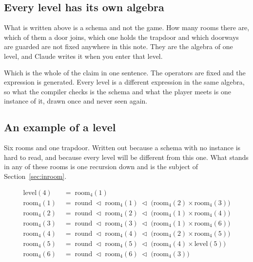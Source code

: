 \documentclass[11pt,a4paper]{article}
\begin{document}
\subsection{Every level has its own algebra}

What is written above is a schema and not the game. How many rooms there are, which of them a door
joins, which one holds the trapdoor and which doorways are guarded are not fixed anywhere in this
note. They are the algebra of one level, and Claude writes it when you enter that level.

\begin{sectionbox}
Which is the whole of the claim in one sentence. The operators are fixed and the expression is
generated. Every level is a different expression in the same algebra, so what the compiler checks
is the schema and what the player meets is one instance of it, drawn once and never seen again.
\end{sectionbox}

\subsection{An example of a level}
\label{sec:example}

Six rooms and one trapdoor. Written out because a schema with no instance is hard to read, and
because every level will be different from this one. What stands in any of these rooms is one
recursion down and is the subject of Section~\ref{sec:inroom}.

\begin{center}
\begin{tcolorbox}[plainbg, colback=pale, width=0.9\textwidth]
\begin{align*}
\text{level}(4)  \;&=\; \text{room}_4(1) \\
\text{room}_4(1) \;&=\; \text{round} \;\lhd\; \text{room}_4(1) \;\lhd\;
   \bigl( \text{room}_4(2) \times \text{room}_4(3) \bigr) \\
\text{room}_4(2) \;&=\; \text{round} \;\lhd\; \text{room}_4(2) \;\lhd\;
   \bigl( \text{room}_4(1) \times \text{room}_4(4) \bigr) \\
\text{room}_4(3) \;&=\; \text{round} \;\lhd\; \text{room}_4(3) \;\lhd\;
   \bigl( \text{room}_4(1) \times \text{room}_4(6) \bigr) \\
\text{room}_4(4) \;&=\; \text{round} \;\lhd\; \text{room}_4(4) \;\lhd\;
   \bigl( \text{room}_4(2) \times \text{room}_4(5) \bigr) \\
\text{room}_4(5) \;&=\; \text{round} \;\lhd\; \text{room}_4(5) \;\lhd\;
   \bigl( \text{room}_4(4) \times \text{level}(5) \bigr) \\
\text{room}_4(6) \;&=\; \text{round} \;\lhd\; \text{room}_4(6) \;\lhd\;
   \bigl( \text{room}_4(3) \bigr)
\end{align*}
\end{tcolorbox}
\end{center}
\end{document}
